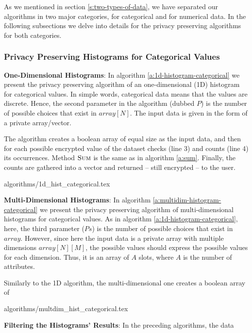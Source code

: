 As we mentioned in section \ref{s:two-types-of-data}, we have separated our algorithms in two major categories, for categorical and for numerical data.
In the following subsections we delve into details for the privacy preserving algorithms for both categories.



\subsubsection{Privacy Preserving Histograms for Categorical Values}\label{sss:histogram-categorical}
\textbf{One-Dimensional Histograms}: In algorithm \ref{a:1d-histogram-categorical} we present the privacy preserving algorithm of an one-dimensional (1D) histogram for categorical values.
In simple words, categorical data means that the values are discrete.
Hence, the second parameter in the algorithm (dubbed $P$) is the number of possible choices that exist in $array[N]$.
The input data is given in the form of a private array/vector.

The algorithm creates a boolean array of equal size as the input data, and then for each possible encrypted value of the dataset checks (line 3) and counts (line 4) its occurrences.
Method { $\textsc{Sum}$} is the same as in algorithm \ref{a:sum}.
Finally, the counts are gathered into a vector and returned -- still encrypted -- to the user.

{algorithms/1d_hist_categorical.tex}



\textbf{Multi-Dimensional Histograms}: In algorithm \ref{a:multidim-histogram-categorical} we present the privacy preserving algorithm of multi-dimensional histograms for categorical values.
As in algorithm \ref{a:1d-histogram-categorical}, here, the third parameter ($Ps$) is the number of possible choices that exist in $array$.
However, since here the input data is a private array with multiple dimensions $array[N][M]$, the possible values should express the possible values for each dimension.
Thus, it is an array of $A$ slots, where $A$ is the number of attributes.

Similarly to the 1D algorithm, the multi-dimensional one creates a boolean array of 

{algorithms/multdim_hist_categorical.tex}


\textbf{Filtering the Histograms' Results}: In the preceding algorithms, the data

